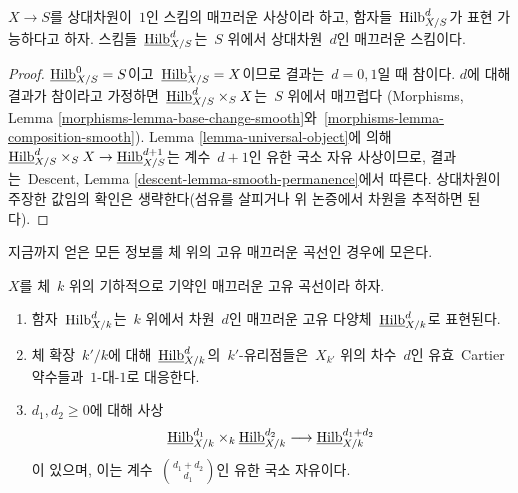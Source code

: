 \begin{lemma}
\label{lemma-hilb-d-smooth}
$X \to S$를 상대차원이\  $1$인 스킴의 매끄러운 사상이라 하고, 함자들\ 
$\mathrm{Hilb}^d_{X/S}$가 표현 가능하다고 하자. 스킴들\ 
$\underline{\mathrm{Hilb}}^d_{X/S}$는\  $S$ 위에서 상대차원\  $d$인 매끄러운
스킴이다.
\end{lemma}

\begin{proof}
$\underline{\mathrm{Hilb}}^0_{X/S} = S$이고\ 
$\underline{\mathrm{Hilb}}^1_{X/S} = X$이므로 결과는\  $d = 0, 1$일 때
참이다. $d$에 대해 결과가 참이라고 가정하면\ 
$\underline{\mathrm{Hilb}}^d_{X/S} \times_S X$는\  $S$ 위에서 매끄럽다
(Morphisms, Lemma \ref{morphisms-lemma-base-change-smooth}와\ 
\ref{morphisms-lemma-composition-smooth}). Lemma
\ref{lemma-universal-object}에 의해\ 
$\underline{\mathrm{Hilb}}^d_{X/S} \times_S X \to
\underline{\mathrm{Hilb}}^{d + 1}_{X/S}$는 계수\  $d + 1$인 유한 국소 자유
사상이므로, 결과는\  Descent, Lemma
\ref{descent-lemma-smooth-permanence}에서 따른다. 상대차원이 주장한 값임의
확인은 생략한다(섬유를 살피거나 위 논증에서 차원을 추적하면 된다).
\end{proof}

\noindent
지금까지 얻은 모든 정보를 체 위의 고유 매끄러운 곡선인 경우에 모은다.

\begin{proposition}
\label{proposition-hilb-d}
$X$를 체\  $k$ 위의 기하적으로 기약인 매끄러운 고유 곡선이라 하자.
\begin{enumerate}
\item 함자\  $\mathrm{Hilb}^d_{X/k}$는\  $k$ 위에서 차원\  $d$인 매끄러운 고유
다양체\  $\underline{\mathrm{Hilb}}^d_{X/k}$로 표현된다.
\item 체 확장\  $k'/k$에 대해\  $\underline{\mathrm{Hilb}}^d_{X/k}$의\ 
$k'$-유리점들은\  $X_{k'}$ 위의 차수\  $d$인 유효\  Cartier 약수들과\ 
$1$-대-$1$로 대응한다.
\item $d_1, d_2 \geq 0$에 대해 사상
$$
\underline{\mathrm{Hilb}}^{d_1}_{X/k}
\times_k
\underline{\mathrm{Hilb}}^{d_2}_{X/k}
\longrightarrow
\underline{\mathrm{Hilb}}^{d_1 + d_2}_{X/k}
$$
이 있으며, 이는 계수\  ${d_1 + d_2 \choose d_1}$인 유한 국소 자유이다.
\end{enumerate}
\end{proposition}

